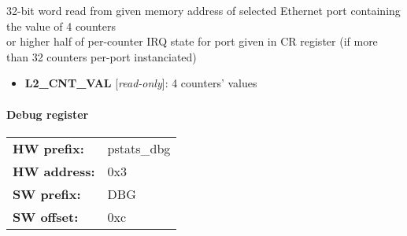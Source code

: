 \vspace{12pt}
32-bit word read from given memory address of selected Ethernet port containing the value of 4 counters \\                   or higher half of per-counter IRQ state for port given in CR register (if more than 32 counters per-port instanciated)

\vspace{12pt}
\noindent
{}

\begin{itemize}
\item \begin{small}
{\bf 
L2\_CNT\_VAL
} [\emph{read-only}]: 4 counters' values
\end{small}
\end{itemize}
\paragraph*{Debug register}\vspace{12pt}

\begin{tabular}{l l }
{\bf HW prefix:}  & pstats\_dbg\\
{\bf HW address:}  & 0x3\\
{\bf SW prefix:}  & DBG\\
{\bf SW offset:}  & 0xc\\
\end{tabular}


